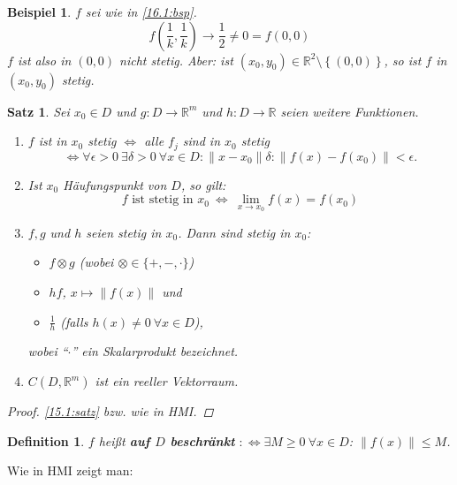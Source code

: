 \documentclass[12pt]{extreport} %
\newcommand{\R}{\mathbb{R}}
\theoremstyle{named}
\theoremstyle{nnamed}
\theoremstyle{itshape}
\newtheorem{satz}[unnamedtheorem]{Satz}
\newtheorem*{definition}{Definition}
\theoremstyle{normal}
\newtheorem{beispiel}[unnamedtheorem]{Beispiel}
\begin{document}
\begin{beispiel} \label{16.3:bsp}
	$f$ sei wie in \ref{16.1:bsp}. 
		$$ f\left( \frac{1}{k}, \frac{1}{k} \right) \longrightarrow \frac{1}{2} \neq 0 = f \left( 0, 0 \right) $$
	$f$ ist also in $(0, 0)$ nicht stetig. Aber: ist $(x_{0}, y_{0}) \in \R^{2} \setminus \left\{ (0, 0) \right\}$, so ist $f$ in $(x_{0}, y_{0})$ stetig.
\end{beispiel}


\begin{satz} \label{16.4:satz}
	Sei $x_{0} \in D$ und $g \colon D \rightarrow \R^{m}$ und $h \colon D \rightarrow \R$ seien weitere Funktionen.
	\begin{enumerate}
		\item $f$ ist in $x_{0}$ stetig $\iff$ alle $f_{j}$ sind in $x_{0}$ stetig 
			$$\iff \forall \epsilon > 0 ~\exists \delta > 0 ~\forall x \in D: \| x - x_{0} \| \delta: \| f(x) - f(x_{0}) \| < \epsilon. $$
		\item Ist $x_{0}$ Häufungspunkt von $D$, so gilt:
			$$ f \text{ ist stetig in } x_{0} ~ \iff ~ \lim_{x \rightarrow x_{0}} f(x) = f(x_{0}) $$
		\item $f, g$ und $h$ seien stetig in $x_{0}$. Dann sind stetig in $x_{0}$:
			\begin{itemize}
				\item $f \otimes g$ (wobei $\otimes \in \{ +, -, \cdot \}$)
				\item $hf$, $x \mapsto \| f(x) \|$ und
				\item $\frac{1}{h}$ (falls $h(x) \neq 0 ~\forall x \in D$),
			\end{itemize}
			wobei \enquote{$\cdot$} ein Skalarprodukt bezeichnet.
		\item $C \left( D, \R^{m} \right)$ ist ein reeller Vektorraum.
	\end{enumerate}
	
	\begin{proof}
		\ref{15.1:satz} bzw. wie in HMI.
	\end{proof}
\end{satz}

\begin{definition}
	$f$ hei{\ss}t \textbf{auf $D$ beschränkt} $: \iff \exists M \geq 0 ~\forall x \in D$: $\| f(x) \| \leq M$.
\end{definition}

Wie in HMI zeigt man:
\end{document}
